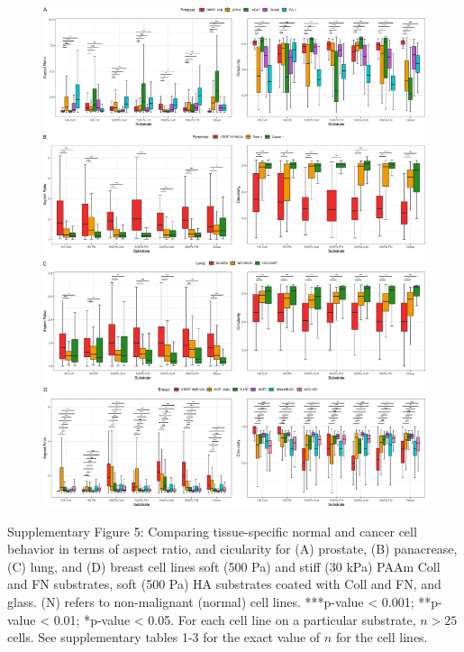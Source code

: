 \documentclass[11pt,letterpaper,english,oneside]{article} %
\begin{document}
\begin{figure}[H]
    \hspace*{-1.5cm}
    \centering
    \includegraphics[scale=0.12]{../Figures/Supplementary_Figure5/supplementary_figure5.png}
    \caption{}
    \label{fig:fig5}
\end{figure}
\begin{adjustwidth}{1cm}{1cm}
  Supplementary Figure 5: Comparing tissue-specific normal and cancer cell behavior in terms of aspect ratio, and cicularity for (A) prostate, (B) panacrease, (C) lung, and (D) breast cell lines 
  soft (500 Pa) and stiff (30 kPa) PAAm Coll and FN substrates, soft (500 Pa) HA substrates coated with Coll and FN, and glass. (N) refers to non-malignant (normal) cell lines.
  ***p-value < 0.001; **p-value < 0.01; *p-value < 0.05. For each cell line on a particular substrate, $n > 25$ cells.
  See supplementary tables 1-3 for the exact value of $n$ for the cell lines.
\end{adjustwidth}
\end{document}
